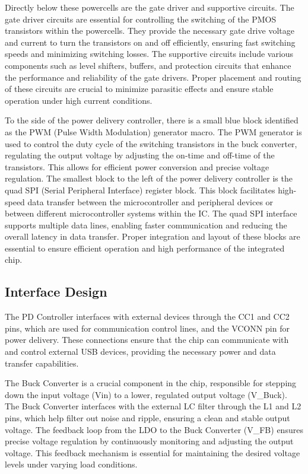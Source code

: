 Directly below these powercells are the gate driver and supportive circuits. The gate driver circuits are essential for controlling the switching of the PMOS transistors within the powercells. They provide the necessary gate drive voltage and current to turn the transistors on and off efficiently, ensuring fast switching speeds and minimizing switching losses. The supportive circuits include various components such as level shifters, buffers, and protection circuits that enhance the performance and reliability of the gate drivers. Proper placement and routing of these circuits are crucial to minimize parasitic effects and ensure stable operation under high current conditions.

To the side of the power delivery controller, there is a small blue block identified as the PWM (Pulse Width Modulation) generator macro. The PWM generator is used to control the duty cycle of the switching transistors in the buck converter, regulating the output voltage by adjusting the on-time and off-time of the transistors. This allows for efficient power conversion and precise voltage regulation. The smallest block to the left of the power delivery controller is the quad SPI (Serial Peripheral Interface) register block. This block facilitates high-speed data transfer between the microcontroller and peripheral devices or between different microcontroller systems within the IC. The quad SPI interface supports multiple data lines, enabling faster communication and reducing the overall latency in data transfer. Proper integration and layout of these blocks are essential to ensure efficient operation and high performance of the integrated chip.
\subsection{Interface Design}
The PD Controller interfaces with external devices through the CC1 and CC2 pins, which are used for communication control lines, and the VCONN pin for power delivery. These connections ensure that the chip can communicate with and control external USB devices, providing the necessary power and data transfer capabilities.

The Buck Converter is a crucial component in the chip, responsible for stepping down the input voltage (Vin) to a lower, regulated output voltage (V\_Buck). The Buck Converter interfaces with the external LC filter through the L1 and L2 pins, which help filter out noise and ripple, ensuring a clean and stable output voltage. The feedback loop from the LDO to the Buck Converter (V\_FB) ensures precise voltage regulation by continuously monitoring and adjusting the output voltage. This feedback mechanism is essential for maintaining the desired voltage levels under varying load conditions.


